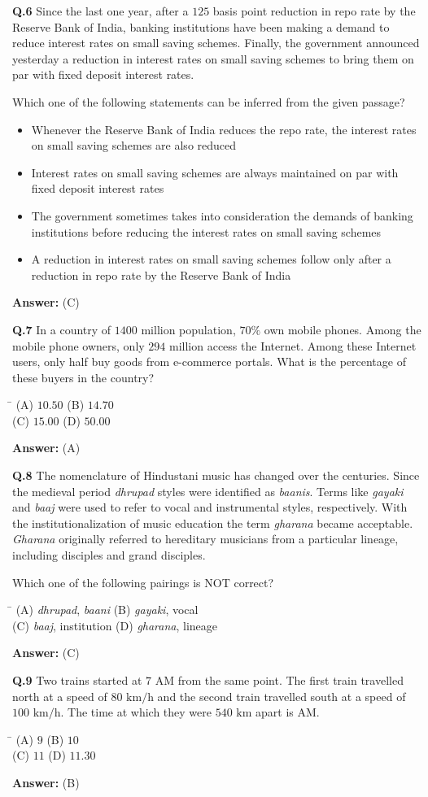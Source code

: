 \documentclass[11pt,a4paper]{article}
\newcommand{\optsfourA}[4]{%
  \begin{tabbing}
    \hspace{0.48\linewidth}\=\kill
    (A) #1 \> (B) #2 \\[2pt]
    (C) #3 \> (D) #4
  \end{tabbing}%
}
\newcommand{\optslistA}[4]{%
  \begin{itemize}
    \setlength{\itemsep}{2pt}\setlength{\parskip}{0pt}
    \item[(A)] #1
    \item[(B)] #2
    \item[(C)] #3
    \item[(D)] #4
  \end{itemize}%
}
\newcommand{\ans}[1]{\textbf{Answer:} #1\par\medskip}
\begin{document}
\textbf{Q.6} Since the last one year, after a $125$ basis point reduction in repo rate by the Reserve Bank of India, banking institutions have been making a demand to reduce interest rates on small saving schemes. Finally, the government announced yesterday a reduction in interest rates on small saving schemes to bring them on par with fixed deposit interest rates.

Which one of the following statements can be inferred from the given passage?
\optslistA{Whenever the Reserve Bank of India reduces the repo rate, the interest rates on small saving schemes are also reduced}{Interest rates on small saving schemes are always maintained on par with fixed deposit interest rates}{The government sometimes takes into consideration the demands of banking institutions before reducing the interest rates on small saving schemes}{A reduction in interest rates on small saving schemes follow only after a reduction in repo rate by the Reserve Bank of India}
\ans{(C)}

\textbf{Q.7} In a country of $1400$ million population, $70\%$ own mobile phones. Among the mobile phone owners, only $294$ million access the Internet. Among these Internet users, only half buy goods from e-commerce portals. What is the percentage of these buyers in the country?
\optsfourA{$10.50$}{$14.70$}{$15.00$}{$50.00$}
\ans{(A)}

\textbf{Q.8} The nomenclature of Hindustani music has changed over the centuries. Since the medieval period \textit{dhrupad} styles were identified as \textit{baanis}. Terms like \textit{gayaki} and \textit{baaj} were used to refer to vocal and instrumental styles, respectively. With the institutionalization of music education the term \textit{gharana} became acceptable. \textit{Gharana} originally referred to hereditary musicians from a particular lineage, including disciples and grand disciples.

Which one of the following pairings is NOT correct?
\optsfourA{\textit{dhrupad}, \textit{baani}}{\textit{gayaki}, vocal}{\textit{baaj}, institution}{\textit{gharana}, lineage}
\ans{(C)}

\textbf{Q.9} Two trains started at $7\text{ AM}$ from the same point. The first train travelled north at a speed of $80\text{ km/h}$ and the second train travelled south at a speed of $100\text{ km/h}$. The time at which they were $540\text{ km}$ apart is \underline{\hspace{1.8cm}} AM.
\optsfourA{$9$}{$10$}{$11$}{$11.30$}
\ans{(B)}
\end{document}
